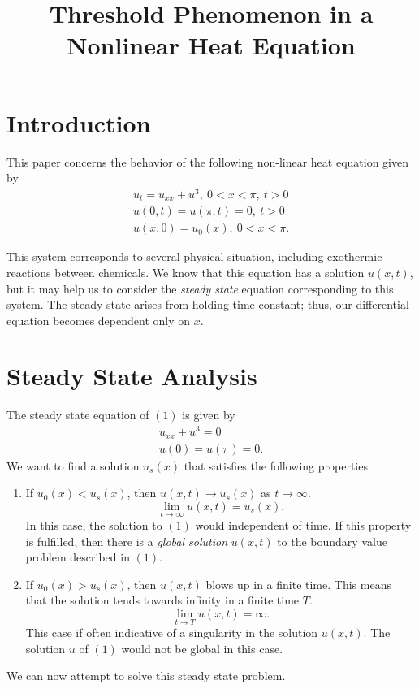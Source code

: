\documentclass{hw}
\title{Threshold Phenomenon in a Nonlinear Heat Equation}
\author{}
\date{}
\begin{document}
\maketitle
\section{Introduction}

This paper concerns the behavior of the following non-linear heat equation given by
\begin{gather}
u_{t}=u_{xx}+u^{3},\ 0<x<\pi,\ t>0\label{nlinh}\\
u(0,t)=u(\pi,t)=0,\ t>0\\
u(x,0)=u_{0}(x),\ 0<x<\pi.
\end{gather}

This system corresponds to several physical situation, including exothermic reactions between
chemicals. We know that this equation has a solution $u(x,t)$, but it may help us to consider the
\textit{steady state} equation corresponding to this system. The steady state arises from holding
time constant; thus, our differential equation becomes dependent only on $x$.

\section{Steady State Analysis}
The steady state equation of $(1)$ is given by
\begin{gather}
u_{xx}+u^{3}=0\label{ssone}\\
u(0)=u(\pi)=0.
\end{gather}
We want to find a solution $u_{s}(x)$ that satisfies the following properties
\begin{enumerate}
\item If $u_{0}(x)<u_{s}(x)$, then $u(x,t)\to u_{s}(x)$ as $t\to\infty$.
\[
\lim_{t\to \infty}u(x,t)=u_{s}(x).
\]
In this case, the solution to $(1)$ would independent of time. If this property is fulfilled, then
there is a \textit{global solution} $u(x,t)$ to the boundary value problem described in $(1)$.
\item If $u_{0}(x)>u_{s}(x)$, then $u(x,t)$ blows up in a finite time. This means that the solution
tends towards infinity in a finite time $T$.
\[
\lim_{t\to T}u(x,t)=\infty.
\]
This case if often indicative of a singularity in the solution $u(x,t)$. The solution $u$ of $(1)$
would not be global in this case.
\end{enumerate}
We can now attempt to solve this steady state problem.
\end{document}
